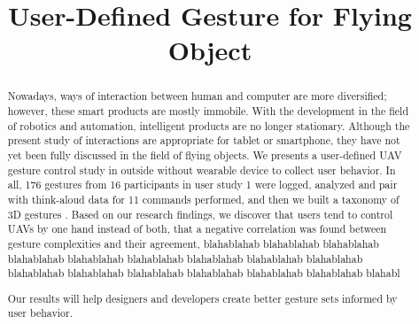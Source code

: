 \documentclass{sigchi}
\begin{document}
\title{User-Defined Gesture for Flying Object}

\maketitle

\begin{abstract}
Nowadays, ways of interaction between human and computer are more diversified; however, these smart products are mostly immobile. With the development in the field of robotics and automation, intelligent products are no longer stationary. Although the present study of interactions are appropriate for tablet or smartphone, they have not yet been fully discussed in the field of flying objects. We presents a user-defined UAV gesture control study in outside without wearable device to collect user behavior. In all, 176 gestures from 16 participants in user study 1 were logged, analyzed and pair with think-aloud data for 11 commands performed, and then we built a taxonomy of 3D gestures . Based on our research findings, we discover that users tend to control UAVs by one hand instead of both, that a negative correlation was found between gesture complexities and their agreement, blahablahab blahablahab blahablahab blahablahab blahablahab blahablahab blahablahab blahablahab blahablahab blahablahab blahablahab blahablahab blahablahab blahablahab blahablahab blahabl

Our results will help designers and developers create better gesture sets informed by user behavior.
\end{abstract}
\end{document}
